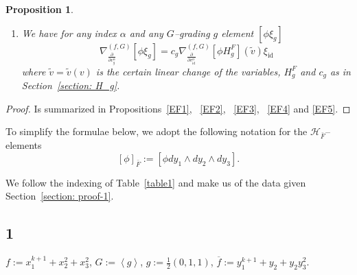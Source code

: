 \documentclass[reqno,12pt]{amsart}
\numberwithin{equation}{section}
\theoremstyle{plain}
\newtheorem{proposition}[theorem]{Proposition}
\theoremstyle{definition}
\newcommand{\CC}{{\mathbb{C}}}
\newcommand{\Jac}{\mathrm{Jac}}
\newcommand{\id}{\mathrm{id}}
\def\H{{\mathcal H}}
\def\T{{\mathcal T}}
\numberwithin{equation}{section}
\begin{document}
\begin{proposition}
\begin{enumerate}
     \item We have for any index $\alpha$ and any $G$--grading $g$ element $[\phi \xi_{g}]$
     \[
        \nabla_{\frac{\partial}{\partial v^\alpha_{g}}}^{(f,G)}[\phi \xi_{g}] = c_g \nabla_{\frac{\partial}{\partial v^\alpha_{\id}}}^{(f,G)}[\phi H_g^F] (\widetilde v) \xi_{\id}
    \]         
    where $\widetilde v = \widetilde v(v)$ is the certain linear change of the variables, $H_g^F$ and $c_g$ as in Section~\ref{section: H_g}.
    \end{enumerate}
\end{proposition}
\begin{proof}
 Is summarized in Propositions~\ref{EF1}, ~\ref{EF2}, ~\ref{EF3}, ~\ref{EF4} and \ref{EF5}.
\end{proof}

To simplify the formulae below, we adopt the following notation for the $\H_{\bar F}$--elements
\[
    [\phi]_{\bar{F}} := [\phi dy_1\wedge dy_2 \wedge dy_3].
\]

We follow the indexing of Table~\ref{table1} and make us of the data given Section~\ref{section: proof-1}.

\subsection*{1} $f:=x_1^{k+1}+x_2^2+x_3^2$, $G:=\left<g\right>$, $g:=\frac{1}{2}(0,1,1)$, $\overline{f}:=y_1^{k+1}+y_2+y_2y_3^2$.
\end{document}
